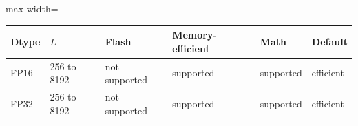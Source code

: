 \scriptsize
\setlength{\tabcolsep}{3.5pt}
\label{tab:t2abackends}
\begin{adjustbox}{max width=\linewidth}
\begin{tabular}{llllll}
\toprule
Dtype & $L$ & Flash & Memory-efficient & Math & Default \\
\midrule
FP16 & 256 to 8192 & not supported & supported & supported & efficient \\
FP32 & 256 to 8192 & not supported & supported & supported & efficient \\
\bottomrule
\end{tabular}
\end{adjustbox}
